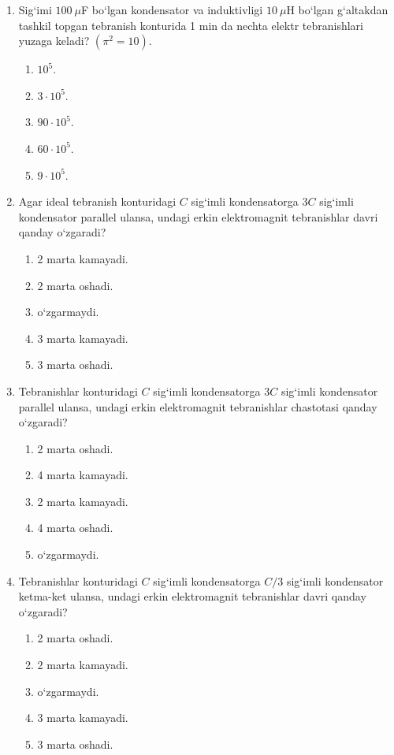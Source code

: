 \begin{enumerate}
\item Sig‘imi $100~\mu$F bo‘lgan kondensator va induktivligi $10~\mu$H bo‘lgan g‘altakdan tashkil topgan tebranish konturida 1 min da nechta elektr tebranishlari yuzaga keladi? $(\pi^2=10)$.
\begin{enumerate}[label=\Alph*)]
\item $10^5$.
\item $3\cdot10^5$.
\item $90\cdot10^5$.
\item $60\cdot10^5$.
\item $9\cdot10^5$.
\end{enumerate}

\item Agar ideal tebranish konturidagi $C$ sig‘imli kondensatorga $3C$ sig‘imli kondensator parallel ulansa, undagi erkin elektromagnit tebranishlar davri qanday o‘zgaradi?
\begin{enumerate}[label=\Alph*)]
\item 2 marta kamayadi.
\item 2 marta oshadi.
\item o‘zgarmaydi.
\item 3 marta kamayadi.
\item 3 marta oshadi.
\end{enumerate}

\item Tebranishlar konturidagi $C$ sig‘imli kondensatorga $3C$ sig‘imli kondensator parallel ulansa, undagi erkin elektromagnit tebranishlar chastotasi qanday o‘zgaradi?
\begin{enumerate}[label=\Alph*)]
\item 2 marta oshadi.
\item 4 marta kamayadi.
\item 2 marta kamayadi.
\item 4 marta oshadi.
\item o‘zgarmaydi.
\end{enumerate}

\item Tebranishlar konturidagi $C$ sig‘imli kondensatorga $C/3$ sig‘imli kondensator ketma-ket ulansa, undagi erkin elektromagnit tebranishlar davri qanday o‘zgaradi?
\begin{enumerate}[label=\Alph*)]
\item 2 marta oshadi.
\item 2 marta kamayadi.
\item o‘zgarmaydi.
\item 3 marta kamayadi.
\item 3 marta oshadi.
\end{enumerate}


\end{enumerate}

